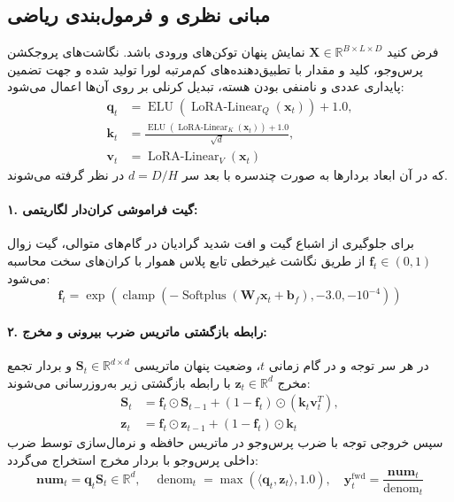 \subsection{مبانی نظری و فرمول‌بندی ریاضی}
فرض کنید $\mathbf{X} \in \mathbb{R}^{B \times L \times D}$ نمایش پنهان توکن‌های ورودی باشد. نگاشت‌های پروجکشن پرس‌وجو، کلید و مقدار با تطبیق‌دهنده‌های کم‌مرتبه لورا تولید شده و جهت تضمین پایداری عددی و نامنفی بودن هسته، تبدیل کرنلی بر روی آن‌ها اعمال می‌شود:
\begin{align}
\mathbf{q}_t &= \operatorname{ELU}(\operatorname{LoRA-Linear}_Q(\mathbf{x}_t)) + 1.0, \\
\mathbf{k}_t &= \frac{\operatorname{ELU}(\operatorname{LoRA-Linear}_K(\mathbf{x}_t)) + 1.0}{\sqrt{d}}, \\
\mathbf{v}_t &= \operatorname{LoRA-Linear}_V(\mathbf{x}_t)
\end{align}
که در آن ابعاد بردارها به صورت چندسره با بعد سر $d = D/H$ در نظر گرفته می‌شوند.

\paragraph{۱. گیت فراموشی کران‌دار لگاریتمی:}
برای جلوگیری از اشباع گیت و افت شدید گرادیان در گام‌های متوالی، گیت زوال $\mathbf{f}_t \in (0, 1)$ از طریق نگاشت غیرخطی تابع پلاس هموار  با کران‌های سخت محاسبه می‌شود:
\begin{equation}
\mathbf{f}_t = \exp\left( \operatorname{clamp}\left( -\operatorname{Softplus}(\mathbf{W}_f \mathbf{x}_t + \mathbf{b}_f), -3.0, -10^{-4} \right) \right)
\end{equation}

\paragraph{۲. رابطه بازگشتی ماتریس ضرب بیرونی و مخرج:}
در هر سر توجه و در گام زمانی $t$، وضعیت پنهان ماتریسی $\mathbf{S}_t \in \mathbb{R}^{d \times d}$ و بردار تجمع مخرج $\mathbf{z}_t \in \mathbb{R}^d$ با رابطه بازگشتی زیر به‌روزرسانی می‌شوند:
\begin{align}
\mathbf{S}_t &= \mathbf{f}_t \odot \mathbf{S}_{t-1} + (1 - \mathbf{f}_t) \odot \left(\mathbf{k}_t \mathbf{v}_t^T\right), \\
\mathbf{z}_t &= \mathbf{f}_t \odot \mathbf{z}_{t-1} + (1 - \mathbf{f}_t) \odot \mathbf{k}_t
\end{align}
سپس خروجی توجه با ضرب پرس‌وجو در ماتریس حافظه و نرمال‌سازی توسط ضرب داخلی پرس‌وجو با بردار مخرج استخراج می‌گردد:
\begin{equation}
\mathbf{num}_t = \mathbf{q}_t \mathbf{S}_t \in \mathbb{R}^d, \quad \operatorname{denom}_t = \max\left(\langle \mathbf{q}_t, \mathbf{z}_t \rangle, 1.0\right), \quad \mathbf{y}_t^{\text{fwd}} = \frac{\mathbf{num}_t}{\operatorname{denom}_t}
\end{equation}

